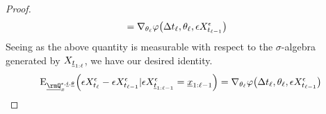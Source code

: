 \begin{proof}
\begin{align*}
    &= \nabla_{\theta_\ell}\varphi\big(\Delta t_\ell, \theta_\ell, \epsilon X^\epsilon_{t_{\ell-1}}\big)
  \end{align*}
  Seeing as the above quantity is measurable with respect to the $\sigma$-algebra generated by $X_{\underline t_{1:\ell}}$, we have our desired identity.
  \begin{equation*}
    \Exp_{\fddPrb^{\epsilon, \underline t,\underline\twistVar}_\stateVar} \Big( \Xe_{t_\ell} - \Xe_{t_{\ell-1}} | \Xe_{\underline t_{1:\ell-1}} = \underline\stateVar_{1:\ell-1} \Big)  = \nabla_{\twistVar_\ell} \affShift\big(\Delta t_\ell, \twistVar_\ell, \Xe_{t_{\ell-1}}\big)
  \end{equation*}
\end{proof}
